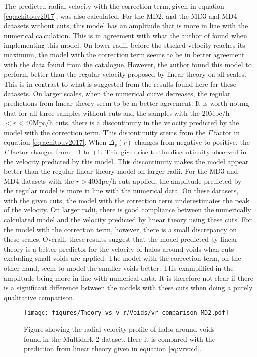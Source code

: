 The predicted radial velocity with the correction term, given in equation \ref{eq:achitouv2017}, was also calculated. For the MD2, and the MD3 and MD4 datasets without cuts, this model has an amplitude that is more in line with the numerical calculation. This is in agreement with what the author of \cite{Achitouv_streaming} found when implementing this model. On lower radii, before the stacked velocity reaches its maximum, the model with the correction term seems to be in better agreement with the data found from the catalogue. However, the author found this model to perform better than the regular velocity proposed by linear theory on all scales. This is in contrast to what is suggested from the results found here for these datasets. On larger scales, when the numerical curve decreases, the regular predictions from linear theory seem to be in better agreement. It is worth noting that for all three samples without cuts and the samples with the $20$Mpc/h$<r<40$Mpc/h cuts, there is a discontinuity in the velocity predicted by the model with the correction term. This discontinuity stems from the $\Gamma$ factor in equation \ref{eq:achitouv2017}. When $\Delta_v(r)$ changes from negative to positive, the $\Gamma$ factor changes from $-1$ to $+1$. This gives rise to the discontinuity observed in the velocity predicted by this model. This discontinuity makes the model appear better than the regular linear theory model on larger radii. For the MD3 and MD4 datasets with the $r>40$Mpc/h cuts applied, the amplitude predicted by the regular model is more in line with the numerical data. On these datasets, with the given cuts, the model with the correction term underestimates the peak of the velocity. On larger radii, there is good compliance between the numerically calculated model and the velocity predicted by linear theory using these cuts. For the model with the correction term, however, there is a small discrepancy on these scales. Overall, these results suggest that the model predicted by linear theory is a better predictor for the velocity of halos around voids when cuts excluding small voids are applied. The model with the correction term, on the other hand, seem to model the smaller voids better. This examplified in the amplitude being more in line with numerical data. It is therefore not clear if there is a significant difference between the models with these cuts when doing a purely qualitative comparison.
\begin{figure}[H]
    \texttt{[image: figures/Theory\_vs\_v\_r/Voids/vr\_comparison\_MD2.pdf]}
    \caption{Figure showing the radial velocity profile of halos around voids found in the Multidark 2 dataset. Here it is compared with the prediction from linear theory given in equation \ref{eq:vrvoid}.}
    \label{fig:vrMD2}
\end{figure}

